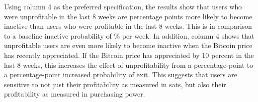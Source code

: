 Using column 4 as the preferred specification, the results show that users who were unprofitable in the last 8 weeks are  percentage points more likely to become inactive than users who were profitable in the last 8 weeks. This is in comparison to a baseline inactive probability of \% per week. In addition, column 4 shows that unprofitable users are even more likely to become inactive when the Bitcoin price has recently appreciated. If the Bitcoin price has appreciated by 10 percent in the last 8 weeks, this increases the effect of unprofitability from a  percentage-point to a  percentage-point increased probability of exit. This suggests that users are sensitive to not just their profitability as measured in sats, but also their profitability as measured in purchasing power. 


